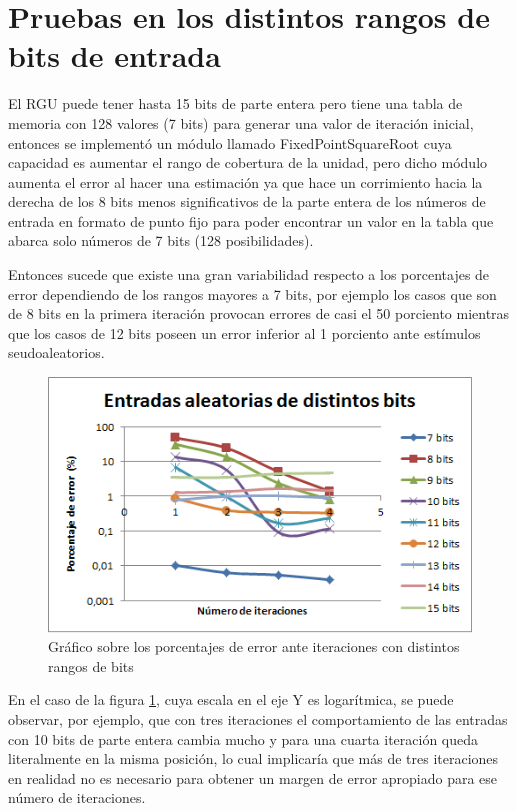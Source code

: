 \section{Pruebas en los distintos rangos de bits de entrada}

El  RGU puede tener hasta 15 bits de parte entera pero tiene una tabla de memoria con 128 valores (7 bits) para generar una valor de iteración inicial, entonces se implementó un módulo llamado FixedPointSquareRoot cuya capacidad es aumentar el rango de cobertura de la unidad, pero dicho módulo aumenta el error al hacer una estimación ya que hace un corrimiento hacia la derecha de los 8 bits menos significativos de la parte entera de los números de entrada en formato de punto fijo para poder encontrar un valor en la tabla que abarca solo números de 7 bits (128 posibilidades).

Entonces sucede que existe una gran variabilidad respecto a los porcentajes de error dependiendo de los rangos mayores a 7 bits, por ejemplo los casos que son de 8 bits en la primera iteración provocan errores de casi el 50 porciento mientras que los casos de 12 bits poseen un error inferior al 1 porciento ante estímulos seudoaleatorios.

\begin{figure}
	\includegraphics[width=0.7\linewidth]{images/puntos}
	\caption{Gráfico sobre los porcentajes de error ante iteraciones con distintos rangos de bits} \label{fig:puntos}
\end{figure}

En el caso de la figura \ref{fig:puntos}, cuya escala en el eje Y es logarítmica, se puede observar, por ejemplo, que con tres iteraciones el comportamiento de las entradas con 10 bits de parte entera cambia mucho y para una cuarta iteración queda literalmente en la misma posición, lo cual implicaría que más de tres iteraciones en realidad no es necesario para obtener un margen de error apropiado para ese número de iteraciones.

